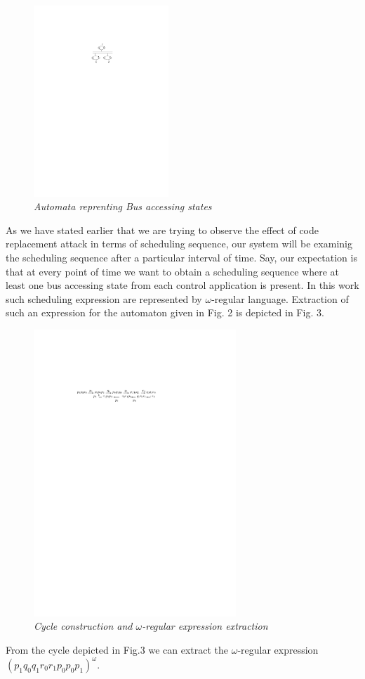 \begin{figure}
\begin{center}
\includegraphics[width=2.0in]{state_diagram_task.pdf}
\end{center}
\vspace{-0.1in}
\caption{{\em Automata reprenting Bus accessing states}}
\label{fig:automaton}
\end{figure}
 As we have stated earlier that we are trying to observe the effect 
of code replacement attack in terms of scheduling sequence, our system will be examinig the
scheduling sequence after a particular interval of time. Say, our expectation is that at
every point of time we want to obtain a scheduling sequence where at least one bus accessing 
state from each control application is present.
In this work such scheduling expression are represented by $\omega$-regular language. Extraction 
of such an expression for the automaton given in Fig. 2 is depicted in Fig. 3.

\begin{figure}[h]
\begin{center}
\includegraphics[width=3.0in]{state_chage_many.pdf}
\end{center}
\vspace{-0.1in}
\caption{{\em Cycle construction and $\omega$-regular expression extraction}}
\label{fig:automaton}
\end{figure}
From the cycle depicted in Fig.3 we can extract the $\omega$-regular expression 
$(p_1q_0q_1r_0r_1p_0p_0p_1)^\omega$.

